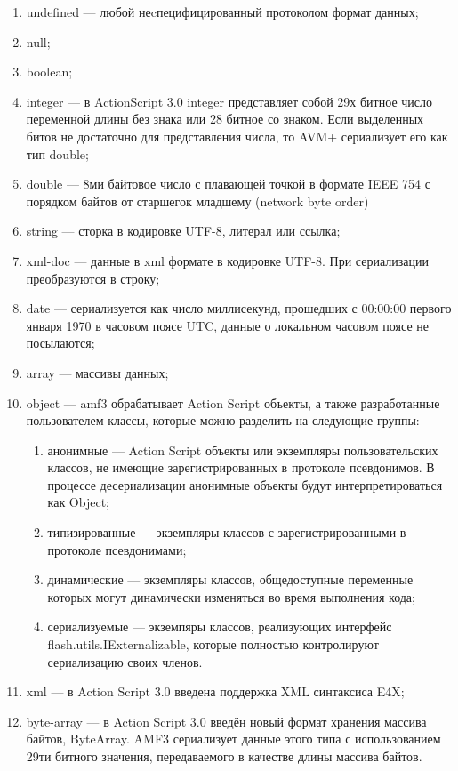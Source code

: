 \begin{enumerate}
\item undefined --- любой неcпецифицированный протоколом формат данных;
\item null;
\item boolean;
\item integer --- в ActionScript 3.0 integer представляет собой 29х битное число переменной длины без знака или 28 битное
со знаком. Если выделенных битов не достаточно для представления числа, то AVM+ сериализует его как тип double;
\item double --- 8ми байтовое число с плавающей точкой в формате IEEE 754 с порядком байтов от старшегок младшему
(network byte order)
\item string --- сторка в кодировке UTF-8, литерал или ссылка;
\item xml-doc --- данные в xml формате в кодировке UTF-8. При сериализации преобразуются в строку;
\item date --- сериализуется как число миллисекунд, прошедших с 00:00:00 первого января 1970 в часовом поясе UTC,
данные о локальном часовом поясе не посылаются;
\item array --- массивы данных;
\item object --- amf3 обрабатывает Action Script объекты, а также разработанные пользователем классы, которые можно
разделить на следующие группы:
\begin{enumerate}
\item анонимные --- Action Script объекты или экземпляры пользовательских классов, не имеющие зарегистрированных в
протоколе псевдонимов. В процессе десериализации анонимные объекты будут интерпретироваться как Object;
\item типизированные --- экземпляры классов с зарегистрированными в протоколе псевдонимами;
\item динамические --- экземпляры классов, общедоступные переменные которых могут динамически изменяться во время
выполнения кода;
\item сериализуемые --- экземпяры классов, реализующих интерфейс flash.utils.IExternalizable, которые полностью
контролируют сериализацию своих членов.
\end{enumerate}
\item xml --- в Action Script 3.0 введена поддержка XML синтаксиса E4X;
\item byte-array --- в Action Script 3.0 введён новый формат хранения массива байтов, ByteArray. AMF3 сериализует
данные этого типа с использованием 29ти битного значения, передаваемого в качестве длины массива байтов.
\end{enumerate} 


